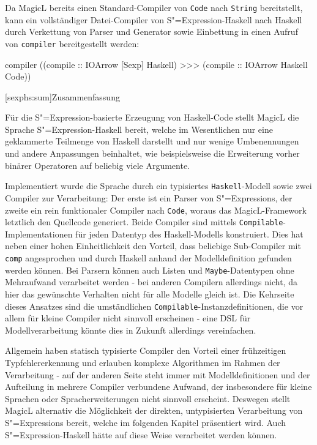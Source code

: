 \documentclass[11pt, a4paper, bibgerm]{scrbook}
\newcommand\icode[1]{\lstinline?#1?}
\newcommand\lsection{}
\newcommand{\sexp}{S"=Expression}
\newcommand{\sexps}{S"=Expressions}
\begin{document}
Da MagicL bereits einen Standard-Compiler von \icode{Code} nach
\icode{String} bereitstellt, kann ein vollständiger Datei-Compiler von
\sexp{}-Haskell nach Haskell durch Verkettung von Parser
und Generator sowie Einbettung in einen Aufruf von \icode{compiler}
bereitgestellt werden:
\begin{code}
compiler ((compile :: IOArrow [Sexp] Haskell) >>> 
          (compile :: IOArrow Haskell Code))  
\end{code}

\lsection[sexphs:sum]{Zusammenfassung}

Für die \sexp{}-basierte Erzeugung von Haskell-Code stellt MagicL die
Sprache \sexp{}-Haskell bereit, welche im Wesentlichen nur eine
geklammerte Teilmenge von Haskell darstellt und nur wenige
Umbenennungen und andere Anpassungen beinhaltet, wie beispielsweise
die Erweiterung vorher binärer Operatoren auf beliebig viele
Argumente.

Implementiert wurde die Sprache durch ein typisiertes
\icode{Haskell}-Modell sowie zwei Compiler zur Verarbeitung: Der erste
ist ein Parser von \sexps{}, der zweite ein rein funktionaler Compiler
nach \icode{Code}, woraus das MagicL-Framework letztlich den Quellcode
generiert. Beide Compiler sind mittels
\icode{Compilable}-Implementationen für jeden Datentyp des
Haskell-Modells konstruiert. Dies hat neben einer hohen
Einheitlichkeit den Vorteil, dass beliebige Sub-Compiler mit
\icode{comp} angesprochen und durch Haskell anhand der
Modelldefinition gefunden werden können. Bei Parsern können auch
Listen und \icode{Maybe}-Datentypen ohne Mehraufwand verarbeitet
werden - bei anderen Compilern allerdings nicht, da hier das
gewünschte Verhalten nicht für alle Modelle gleich ist. Die Kehrseite
dieses Ansatzes sind die umständlichen
\icode{Compilable}-Instanzdefinitionen, die vor allem für kleine
Compiler nicht sinnvoll erscheinen - eine DSL für
Modellverarbeitung könnte dies in Zukunft allerdings vereinfachen.

Allgemein haben statisch typisierte Compiler den Vorteil einer
frühzeitigen Typfehlererkennung und erlauben komplexe Algorithmen im
Rahmen der Verarbeitung - auf der anderen Seite steht immer mit
Modelldefinitionen und der Aufteilung in mehrere Compiler verbundene
Aufwand, der insbesondere für kleine Sprachen oder Spracherweiterungen
nicht sinnvoll erscheint. Deswegen stellt MagicL alternativ die
Möglichkeit der direkten, untypisierten Verarbeitung von \sexps{}
bereit, welche im folgenden Kapitel präsentiert wird. Auch
\sexp{}-Haskell hätte auf diese Weise verarbeitet werden können.
\end{document}
